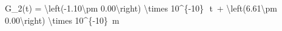 G_2(t) = \SI[parse-numbers = false]{\left(-1.10\pm 0.00\right) \times 10^{-10}}{}\, \cdot \,t\, + \SI[parse-numbers = false]{\left(6.61\pm 0.00\right) \times 10^{-10}}{\meter}
